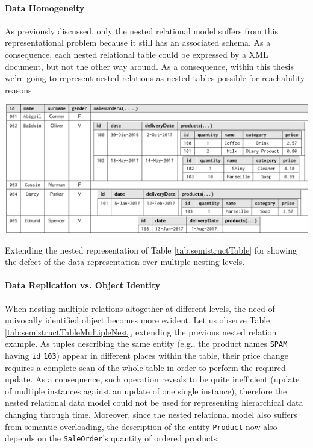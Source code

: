 \paragraph*{Data Homogeneity} As previously discussed, only the nested relational model suffers from this representational problem because it still has an associated schema. As a consequence, each nested relational table could be expressed by a XML document, but not the other way around. As a consequence, within this thesis we're going to represent nested relations as nested tables   possible for reachability reasons.


\begin{table}[!t]
\centering
\includegraphics[scale=0.7]{fig/02models/02nestedaggrSales.pdf}
\caption{Extending the nested representation of Table \ref{tab:semistructTable} for showing the defect of the data representation over multiple nesting levels.}
\label{tab:semistructTableMultipleNest}
\end{table}
\paragraph*{Data Replication vs. Object Identity}
When nesting multiple relations altogether at different levels, the need of univocally identified object becomes more evident. Let us observe Table \ref{tab:semistructTableMultipleNest}, extending the previous nested relation example. As  tuples describing the same entity (e.g., the product names \texttt{SPAM} having \texttt{id} \texttt{103}) appear in different places within the table, their price change requires a complete scan of the whole table in order to perform the required update. As a consequence, such operation reveals to be quite inefficient (update of multiple instances against an update of one single instance), therefore the nested relational data model could not be used for representing hierarchical data changing through time. Moreover, since the nested relational model also suffers from semantic overloading, the description of the entity \texttt{Product} now also depends on the \texttt{SaleOrder}'s quantity of ordered products.


